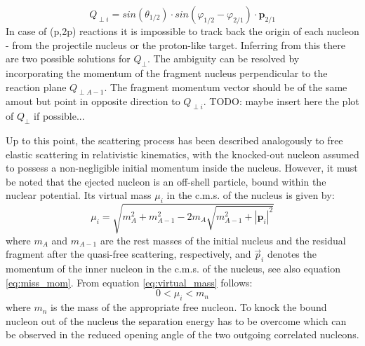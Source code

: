 \begin{equation}\label{eq:chulkov}
Q_{\perp i} = sin(\theta_{1/2})\cdot sin(\varphi_{1/2} -\varphi_{2/1})\cdot\mathbf{p}_{2/1}
\end{equation}
In case of (p,2p) reactions it is impossible to track back the origin of each nucleon - from the projectile nucleus or the proton-like target. Inferring from this there are two possible solutions for $Q_{\perp}$. The ambiguity can be resolved by incorporating the momentum of the fragment nucleus perpendicular to the reaction plane $Q_{\perp A-1}$. The fragment momentum vector should be of the same amout but point in opposite direction to $Q_{\perp i}$.
TODO: maybe insert here the plot of $Q_{\perp}$ if possible...

Up to this point, the scattering process has been described analogously to free elastic scattering in relativistic kinematics, with the knocked-out nucleon assumed to possess a non-negligible initial momentum inside the nucleus. However, it must be noted that the ejected nucleon is an off-shell particle, bound within the nuclear potential. Its virtual mass \( \mu_i \) in the c.m.s. of the nucleus is given by:
\begin{equation}
\mu_i =  \sqrt{m_A^2 + m_{A-1}^2 - 2m_A\sqrt{m_{A-1}^2 + |\mathbf{p}_i|^2}}
\label{eq:virtual_mass}
\end{equation}
where \( m_A \) and \( m_{A-1} \) are the rest masses of the initial nucleus and the residual fragment after the quasi-free scattering, respectively, and \( \vec{p}_{i} \) denotes the momentum of the inner nucleon  in the c.m.s. of the nucleus, see also equation \ref{eq:miss_mom}. From equation \ref{eq:virtual_mass} follows:
\begin{equation}
0 < \mu_i  < m_n
\end{equation}
where $m_n$ is the mass of the appropriate free nucleon.
To knock the bound nucleon out of the nucleus the separation energy has to be overcome which can be observed in the reduced opening angle of the two outgoing correlated nucleons.



%

